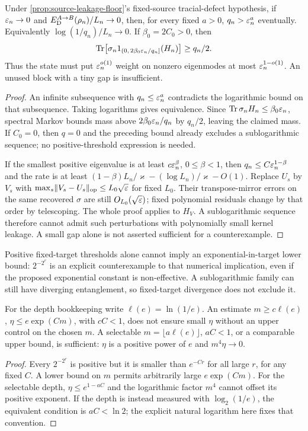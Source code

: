 \begin{proposition}\label{prop:populated-slow-modes}
Under \cref{prop:source-leakage-floor}'s fixed-source tracial-defect hypothesis, if $\varepsilon_n\to0$ and $E_{\mathrm D}^{A\to B}(\rho_n)/L_n\to0$, then, for every fixed $a>0$, $q_n>\varepsilon_n^a$ eventually. Equivalently $\log(1/q_n)/L_n\to0$. If $\beta_0=2C_0>0$, then
\[
 \operatorname{Tr}\bigl[\sigma_n1_{(0,\,2\beta_0\varepsilon_n/q_n]}(H_n)\bigr]\ge q_n/2.
\]
Thus the state must put $\varepsilon_n^{o(1)}$ weight on nonzero eigenmodes at most $\varepsilon_n^{1-o(1)}$. An unused block with a tiny gap is insufficient.
\end{proposition}
\begin{proof}
An infinite subsequence with $q_n\le\varepsilon_n^a$ contradicts the logarithmic bound on that subsequence. Taking logarithms gives equivalence. Since $\operatorname{Tr}\sigma_nH_n\le \beta_0\varepsilon_n$, spectral Markov bounds mass above $2\beta_0\varepsilon_n/q_n$ by $q_n/2$, leaving the claimed mass. If $C_0=0$, then $q=0$ and the preceding bound already excludes a sublogarithmic sequence; no positive-threshold expression is needed.

If the smallest positive eigenvalue is at least $c\varepsilon_n^\beta$, $0\le\beta<1$, then $q_n\le C\varepsilon_n^{1-\beta}$ and the rate is at least $(1-\beta)L_n/\varkappa-(\log L_n)/\varkappa-O(1)$. Replace $U_s$ by $V_s$ with $\max_s\lVert V_s-U_s\rVert_{\mathrm{op}}\le L_0\sqrt{\varepsilon}$ for fixed $L_0$. Their transpose-mirror errors on the same recovered $\sigma$ are still $O_{L_0}(\sqrt{\varepsilon})$; fixed polynomial residuals change by that order by telescoping. The whole proof applies to $H_V$. A sublogarithmic sequence therefore cannot admit such perturbations with polynomially small kernel leakage. A small gap alone is not asserted sufficient for a counterexample.
\end{proof}

\begin{remark}\label{prop:selectable-depth}
Positive fixed-target thresholds alone cannot imply an exponential-in-target lower bound: $2^{-2^r}$ is an explicit counterexample to that numerical implication, even if the proposed exponential constant is non-effective. A sublogarithmic family can still have diverging entanglement, so fixed-target divergence does not exclude it.

For the depth bookkeeping write $\ell(e)=\ln(1/e)$. An estimate $m\ge c\ell(e)$, $\eta\le e\exp(Cm)$, with $cC<1$, does not ensure small $\eta$ without an upper control on the chosen $m$. A selectable $m=\lfloor a\ell(e)\rfloor$, $aC<1$, or a comparable upper bound, is sufficient: $\eta$ is a positive power of $e$ and $m^4\eta\to0$.
\end{remark}
\begin{proof}
Every $2^{-2^r}$ is positive but it is smaller than $e^{-Cr}$ for all large $r$, for any fixed $C$. A lower bound on $m$ permits arbitrarily large $e\exp(Cm)$. For the selectable depth, $\eta\le e^{1-aC}$ and the logarithmic factor $m^4$ cannot offset its positive exponent. If the depth is instead measured with $\log_2(1/e)$, the equivalent condition is $aC<\ln2$; the explicit natural logarithm here fixes that convention.
\end{proof}
